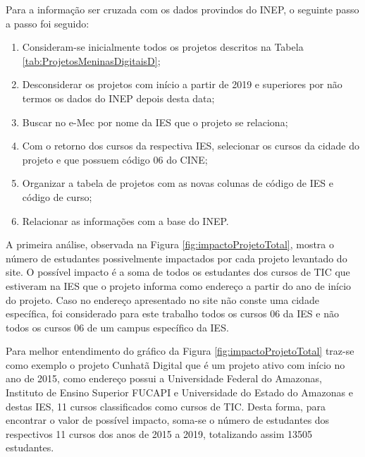 


Para a informação ser cruzada com os dados provindos do INEP, o seguinte passo a passo foi seguido:
\begin{enumerate}
\item Consideram-se inicialmente todos os projetos descritos na Tabela \ref{tab:ProjetosMeninasDigitaisD};
\item Desconsiderar os projetos com início a partir de 2019 e superiores por não termos os dados do INEP depois desta data; 
\item Buscar no e-Mec por nome da IES que o projeto se relaciona;
\item Com o retorno dos cursos da respectiva IES, selecionar os cursos da cidade do projeto e que possuem código 06 do CINE;
\item Organizar a tabela de projetos com as novas colunas de código de IES e código de curso;
\item Relacionar as informações com a base do INEP. 
\end{enumerate}






A primeira análise, observada na Figura \ref{fig:impactoProjetoTotal}, mostra o número de estudantes possivelmente impactados por cada projeto levantado do site. O possível impacto é a soma de todos os estudantes dos cursos de TIC que estiveram na IES que o projeto informa como endereço a partir do ano de início do projeto. Caso no endereço apresentado no site não conste uma cidade específica, foi considerado para este trabalho todos os cursos 06 da IES e não todos os cursos 06 de um campus específico da IES. 

Para melhor entendimento do gráfico da Figura \ref{fig:impactoProjetoTotal} traz-se como exemplo o projeto Cunhatã Digital que é um projeto ativo com início no ano de 2015, como endereço possui a Universidade Federal do Amazonas, Instituto de Ensino Superior FUCAPI e Universidade do Estado do Amazonas e destas IES, 11 cursos classificados como cursos de TIC. Desta forma, para encontrar o valor de possível impacto, soma-se o número de estudantes dos respectivos 11 cursos dos anos de 2015 a 2019, totalizando assim 13505 estudantes.

